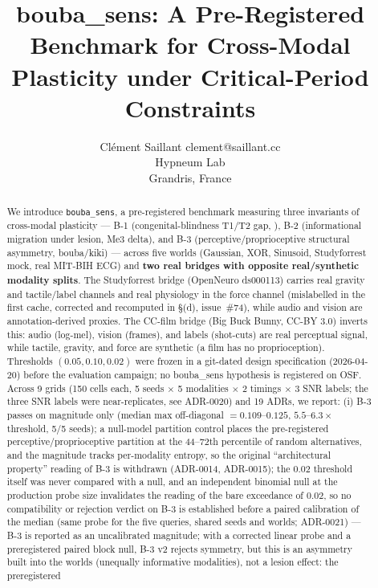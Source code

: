 \documentclass{article}
\title{bouba\_sens: A Pre-Registered Benchmark for Cross-Modal
       Plasticity under Critical-Period Constraints}
\author{%
  \name Cl{\'e}ment Saillant
  \email clement@saillant.cc \\
  \addr Hypneum Lab \\
  Grandris, France
}
\begin{document}
\maketitle

\begin{abstract}
We introduce \texttt{bouba\_sens}, a pre-registered benchmark
measuring three invariants of cross-modal plasticity --- B-1
(congenital-blindness T1/T2 gap, \citealp{cohen1999period, sadato2002critical, collignon2013impact}), B-2
(informational migration under lesion, Me3 delta), and B-3
(perceptive/proprioceptive structural asymmetry, bouba/kiki) ---
across five worlds (Gaussian, XOR, Sinusoid, Studyforrest mock,
real MIT-BIH ECG) and \textbf{two real bridges with opposite
real/synthetic modality splits}. The Studyforrest bridge (OpenNeuro
ds000113) carries real gravity and tactile/label channels and real
physiology in the force channel (mislabelled in the first cache,
corrected and recomputed in \S(d), issue~\#74),
while audio and vision are annotation-derived proxies. The CC-film
bridge (Big Buck Bunny, CC-BY 3.0) inverts this: audio (log-mel),
vision (frames), and labels (shot-cuts) are real perceptual signal,
while tactile, gravity, and force are synthetic (a film has no
proprioception).
Thresholds $(0.05, 0.10, 0.02)$ were frozen in a git-dated
design specification (2026-04-20) before the evaluation campaign;
no bouba\_sens hypothesis is registered on OSF. Across 9 grids
(150 cells each, 5 seeds $\times$ 5
modalities $\times$ 2 timings $\times$ 3 SNR labels; the three SNR
labels were near-replicates, see ADR-0020) and 19 ADRs, we
report: (i) B-3 passes on magnitude only (median max off-diagonal
$= 0.109$--$0.125$, $5.5$--$6.3\times$ threshold, 5/5 seeds); a
null-model partition control places the pre-registered
perceptive/proprioceptive partition at the 44--72th percentile of
random alternatives, and the magnitude tracks per-modality
entropy, so the original ``architectural property'' reading of
B-3 is withdrawn (ADR-0014, ADR-0015); the $0.02$ threshold itself
was never compared with a null, and an independent binomial null at
the production probe size invalidates the reading of the bare
exceedance of $0.02$, so no compatibility or rejection verdict on
B-3 is established before a paired calibration of the median (same
probe for the five queries, shared seeds and worlds; ADR-0021) ---
B-3 is reported as an uncalibrated magnitude; with a corrected
linear probe and a preregistered paired block null, B-3 v2 rejects
symmetry, but this is an asymmetry built into the worlds (unequally
informative modalities), not a lesion effect: the preregistered

\end{abstract}
\end{document}
